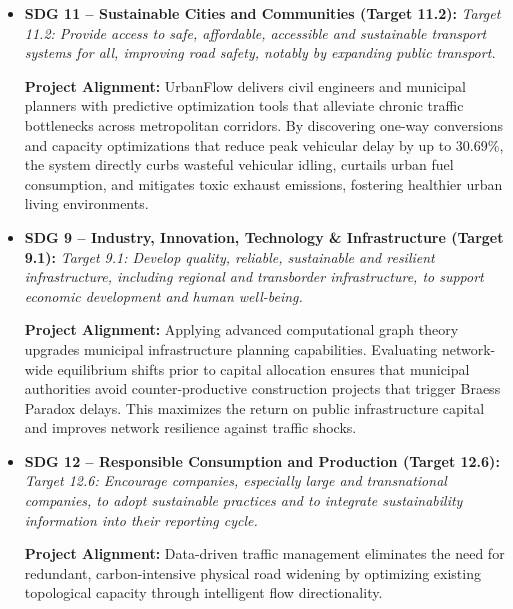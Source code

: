 \documentclass[12pt,a4paper]{report}
\begin{document}
\begin{itemize}
    \item \textbf{SDG 11 -- Sustainable Cities and Communities (Target 11.2):}
    \textit{Target 11.2: Provide access to safe, affordable, accessible and sustainable transport systems for all, improving road safety, notably by expanding public transport.}
    
    \textbf{Project Alignment:} UrbanFlow delivers civil engineers and municipal planners with predictive optimization tools that alleviate chronic traffic bottlenecks across metropolitan corridors. By discovering one-way conversions and capacity optimizations that reduce peak vehicular delay by up to 30.69\%, the system directly curbs wasteful vehicular idling, curtails urban fuel consumption, and mitigates toxic exhaust emissions, fostering healthier urban living environments.

    \item \textbf{SDG 9 -- Industry, Innovation, Technology \& Infrastructure (Target 9.1):}
    \textit{Target 9.1: Develop quality, reliable, sustainable and resilient infrastructure, including regional and transborder infrastructure, to support economic development and human well-being.}
    
    \textbf{Project Alignment:} Applying advanced computational graph theory upgrades municipal infrastructure planning capabilities. Evaluating network-wide equilibrium shifts prior to capital allocation ensures that municipal authorities avoid counter-productive construction projects that trigger Braess Paradox delays. This maximizes the return on public infrastructure capital and improves network resilience against traffic shocks.

    \item \textbf{SDG 12 -- Responsible Consumption and Production (Target 12.6):}
    \textit{Target 12.6: Encourage companies, especially large and transnational companies, to adopt sustainable practices and to integrate sustainability information into their reporting cycle.}
    
    \textbf{Project Alignment:} Data-driven traffic management eliminates the need for redundant, carbon-intensive physical road widening by optimizing existing topological capacity through intelligent flow directionality.
\end{itemize}
\end{document}
